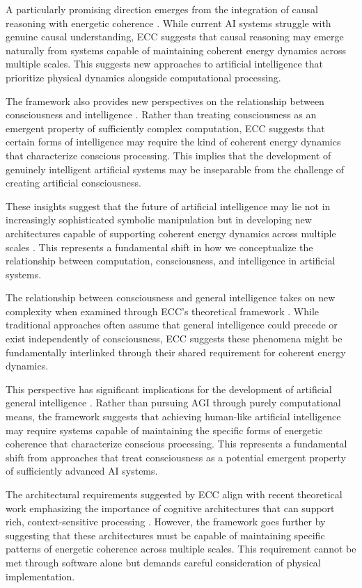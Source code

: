 A particularly promising direction emerges from the integration of causal reasoning with energetic coherence \cite{Pearl2018}. While current AI systems struggle with genuine causal understanding, ECC suggests that causal reasoning may emerge naturally from systems capable of maintaining coherent energy dynamics across multiple scales. This suggests new approaches to artificial intelligence that prioritize physical dynamics alongside computational processing.

The framework also provides new perspectives on the relationship between consciousness and intelligence \cite{Searle2004}. Rather than treating consciousness as an emergent property of sufficiently complex computation, ECC suggests that certain forms of intelligence may require the kind of coherent energy dynamics that characterize conscious processing. This implies that the development of genuinely intelligent artificial systems may be inseparable from the challenge of creating artificial consciousness.

These insights suggest that the future of artificial intelligence may lie not in increasingly sophisticated symbolic manipulation but in developing new architectures capable of supporting coherent energy dynamics across multiple scales \cite{Tegmark2017}. This represents a fundamental shift in how we conceptualize the relationship between computation, consciousness, and intelligence in artificial systems.

The relationship between consciousness and general intelligence takes on new complexity when examined through ECC's theoretical framework \cite{Tononi2015}. While traditional approaches often assume that general intelligence could precede or exist independently of consciousness, ECC suggests these phenomena might be fundamentally interlinked through their shared requirement for coherent energy dynamics.

This perspective has significant implications for the development of artificial general intelligence \cite{Zarkadakis2016}. Rather than pursuing AGI through purely computational means, the framework suggests that achieving human-like artificial intelligence may require systems capable of maintaining the specific forms of energetic coherence that characterize conscious processing. This represents a fundamental shift from approaches that treat consciousness as a potential emergent property of sufficiently advanced AI systems.

The architectural requirements suggested by ECC align with recent theoretical work emphasizing the importance of cognitive architectures that can support rich, context-sensitive processing \cite{Sloman2019}. However, the framework goes further by suggesting that these architectures must be capable of maintaining specific patterns of energetic coherence across multiple scales. This requirement cannot be met through software alone but demands careful consideration of physical implementation.

